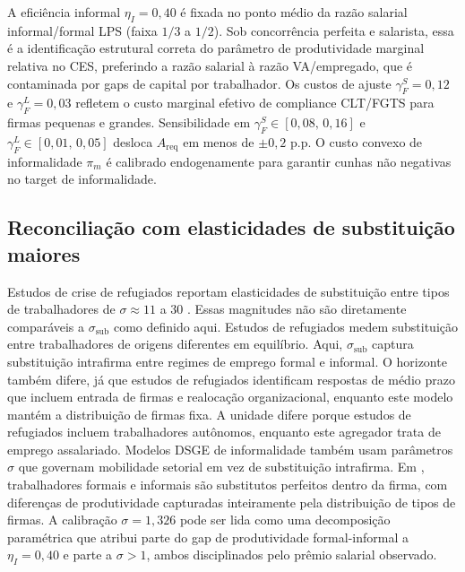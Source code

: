 \documentclass[12pt,a4paper]{article}
\begin{document}
A efici\^encia informal $\eta_I=0{,}40$ \'e fixada no ponto m\'edio da raz\~ao salarial informal/formal LPS (faixa $1/3$ a $1/2$). Sob concorr\^encia perfeita e salarista, essa \'e a identifica\c{c}\~ao estrutural correta do par\^ametro de produtividade marginal relativa no CES, preferindo a raz\~ao salarial \`a raz\~ao VA/empregado, que \'e contaminada por gaps de capital por trabalhador. Os custos de ajuste $\gamma_F^S=0{,}12$ e $\gamma_F^L=0{,}03$ refletem o custo marginal efetivo de compliance CLT/FGTS para firmas pequenas e grandes. Sensibilidade em $\gamma_F^S\in[0{,}08,\,0{,}16]$ e $\gamma_F^L\in[0{,}01,\,0{,}05]$ desloca $A_{\text{req}}$ em menos de $\pm 0{,}2$ p.p. O custo convexo de informalidade $\pi_m$ \'e calibrado endogenamente para garantir cunhas n\~ao negativas no target de informalidade.

\subsection{Reconcilia\c{c}\~ao com elasticidades de substitui\c{c}\~ao maiores}\label{app:sigma_discussion}

Estudos de crise de refugiados reportam elasticidades de substitui\c{c}\~ao entre tipos de trabalhadores de $\sigma\approx 11$ a $30$ \citep{OttavianoPeri2012, BaharDiTellaGulek2025}. Essas magnitudes n\~ao s\~ao diretamente compar\'aveis a $\sigma_{\text{sub}}$ como definido aqui. Estudos de refugiados medem substitui\c{c}\~ao entre trabalhadores de origens diferentes em equil\'ibrio. Aqui, $\sigma_{\text{sub}}$ captura substitui\c{c}\~ao intrafirma entre regimes de emprego formal e informal. O horizonte tamb\'em difere, j\'a que estudos de refugiados identificam respostas de m\'edio prazo que incluem entrada de firmas e realoca\c{c}\~ao organizacional, enquanto este modelo mant\'em a distribui\c{c}\~ao de firmas fixa. A unidade difere porque estudos de refugiados incluem trabalhadores aut\^onomos, enquanto este agregador trata de emprego assalariado. Modelos DSGE de informalidade \citep{LeyvaUrrutia2020, McKiernan2021} tamb\'em usam par\^ametros $\sigma$ que governam mobilidade setorial em vez de substitui\c{c}\~ao intrafirma. Em \citet{Ulyssea2018}, trabalhadores formais e informais s\~ao substitutos perfeitos dentro da firma, com diferen\c{c}as de produtividade capturadas inteiramente pela distribui\c{c}\~ao de tipos de firmas. A calibra\c{c}\~ao $\sigma=1{,}326$ pode ser lida como uma decomposi\c{c}\~ao param\'etrica que atribui parte do gap de produtividade formal-informal a $\eta_I=0{,}40$ e parte a $\sigma>1$, ambos disciplinados pelo pr\^emio salarial observado.
\end{document}
